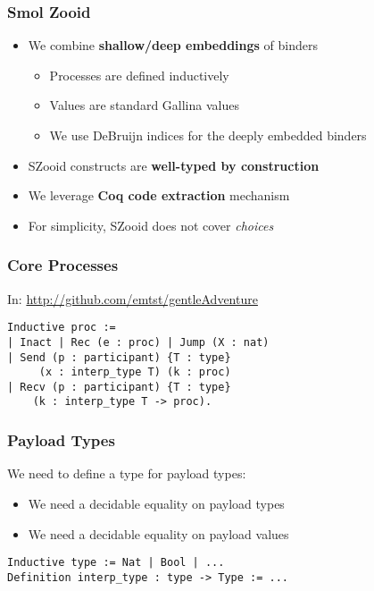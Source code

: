 \begin{frame}
    \frametitle{Smol Zooid}
    \begin{greenbox}{}
    \begin{itemize}
    \item We combine \textbf{shallow/deep embeddings} of binders
    \begin{itemize}
    \item Processes are defined inductively
    \item Values are standard Gallina values
    \item We use DeBruijn indices for the deeply embedded binders
    \end{itemize}
    \item SZooid constructs are \textbf{well-typed by construction}
    \end{itemize}
    \end{greenbox}
    \begin{greenbox}{}
    \begin{itemize}
    \item We leverage \textbf{Coq code extraction} mechanism
    \item For simplicity, SZooid does not cover \emph{choices}
    \end{itemize}
    \end{greenbox}
\end{frame}

\begin{frame}[fragile]
    \frametitle{Core Processes}
    In: \url{http://github.com/emtst/gentleAdventure}
\vspace{.5cm}
    \begin{verbatim}
Inductive proc :=
| Inact | Rec (e : proc) | Jump (X : nat)
| Send (p : participant) {T : type}
     (x : interp_type T) (k : proc)
| Recv (p : participant) {T : type}
    (k : interp_type T -> proc).
    \end{verbatim}    
\end{frame}

\begin{frame}[fragile]
    \frametitle{Payload Types}
    We need to define a type for payload types:
    \begin{itemize}
    \item We need a decidable equality on payload types
    \item We need a decidable equality on payload values
    \end{itemize}
\vspace{1cm}
    \begin{verbatim}
Inductive type := Nat | Bool | ...
Definition interp_type : type -> Type := ...
    \end{verbatim}
\end{frame}

